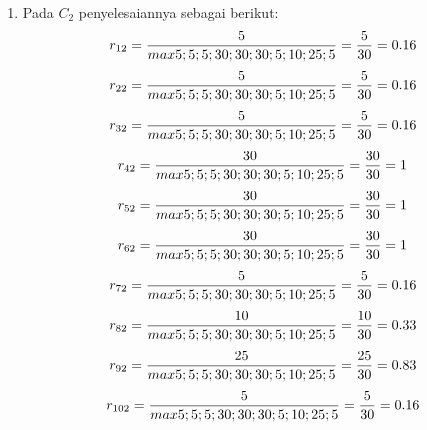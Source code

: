 \begin{enumerate}
\item Pada $C_{2}$ penyelesaiannya sebagai berikut:
\begin{displaymath}
r_{12} = \frac{5}{max {5;5;5;30;30;30;5;10;25;5}} = \frac{5}{30} = 0.16\\
\end {displaymath}
\begin{displaymath}
r_{22} = \frac{5}{max {5;5;5;30;30;30;5;10;25;5}} = \frac{5}{30} = 0.16\\
\end{displaymath}
\begin{displaymath}
r_{32} = \frac{5}{max {5;5;5;30;30;30;5;10;25;5}} = \frac{5}{30} = 0.16\\
\end {displaymath}
\begin{displaymath}
r_{42} = \frac{30}{max {5;5;5;30;30;30;5;10;25;5}} = \frac{30}{30} = 1\\
\end {displaymath}
\begin{displaymath}
r_{52} = \frac{30}{max {5;5;5;30;30;30;5;10;25;5}} = \frac{30}{30} = 1\\
\end {displaymath}
\begin{displaymath}
r_{62} = \frac{30}{max {5;5;5;30;30;30;5;10;25;5}} = \frac{30}{30} = 1\\
\end {displaymath}
\begin{displaymath}
r_{72} = \frac{5}{max {5;5;5;30;30;30;5;10;25;5}} = \frac{5}{30} = 0.16\\
\end {displaymath}
\begin{displaymath}
r_{82} = \frac{10}{max {5;5;5;30;30;30;5;10;25;5}} = \frac{10}{30} = 0.33\\
\end {displaymath}
\begin{displaymath}
r_{92} = \frac{25}{max {5;5;5;30;30;30;5;10;25;5}} = \frac{25}{30} = 0.83\\
\end {displaymath}
\begin{displaymath}
r_{102} = \frac{5}{max {5;5;5;30;30;30;5;10;25;5}} = \frac{5}{30} = 0.16\\
\end {displaymath}


\end{enumerate}
